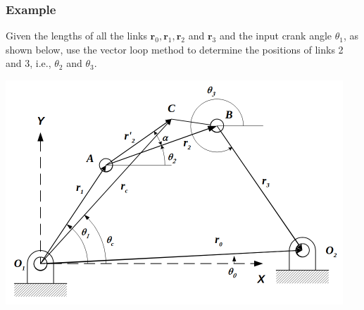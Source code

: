 \documentclass[11pt]{article}
\begin{document}
\subsubsection{Example}
\label{sec:org265d991}
Given the lengths of all the links \(\boldsymbol{r}_0, \boldsymbol{r}_1, \boldsymbol{r}_2\) and \(\boldsymbol{r}_3\) and the input crank angle \(\theta_1\), as shown below, use the vector loop method to determine the positions of links 2 and 3, i.e., \(\theta_2\) and \(\theta_3\).
\begin{center}
\includegraphics[width=.9\linewidth]{./images/vector-loop-position-analysis-example.png}
\end{center}
\end{document}

